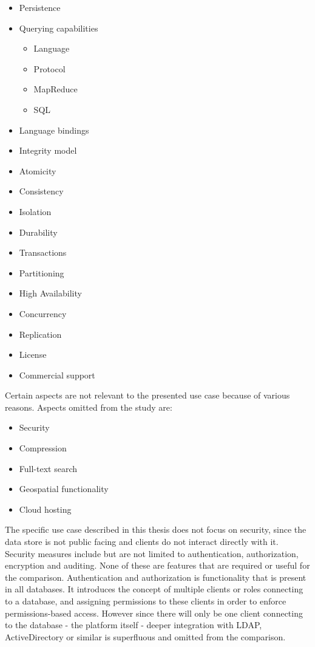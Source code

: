 \begin{itemize}
  \item Persistence
  \item Querying capabilities
    \begin{itemize}
      \item Language
      \item Protocol
      \item MapReduce
      \item SQL
    \end{itemize}
  \item Language bindings

  \item Integrity model

  \item Atomicity
  \item Consistency
  \item Isolation
  \item Durability
  \item Transactions

  \item Partitioning
  \item High Availability
  \item Concurrency
  \item Replication


  \item License
  \item Commercial support
\end{itemize}

Certain aspects are not relevant to the presented use case because of various reasons.
Aspects omitted from the study are:

\begin{itemize}
  \item Security
  \item Compression
  \item Full-text search
  \item Geospatial functionality
  \item Cloud hosting
\end{itemize}

The specific use case described in this thesis does not focus on security, since the data store is not public facing and clients do not interact directly with it.
Security measures include but are not limited to authentication, authorization, encryption and auditing.
None of these are features that are required or useful for the comparison.
Authentication and authorization is functionality that is present in all databases.
It introduces the concept of multiple clients or roles connecting to a database, and assigning permissions to these clients in order to enforce permissions-based access.
However since there will only be one client connecting to the database - the platform itself - deeper integration with LDAP, ActiveDirectory or similar is superfluous and omitted from the comparison.


